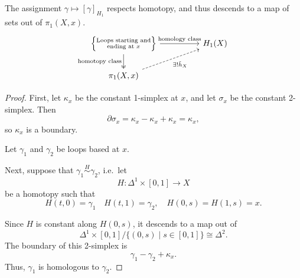 \documentclass[main.tex]{subfiles}
\begin{document}
\begin{lemma}
  \label{lemma:hurewicz_respects_homology_class}
  The assignment $\gamma \mapsto [\gamma]_{H_{1}}$ respects homotopy, and thus descends to a map of sets out of $\pi_{1}(X, x)$.
  \begin{equation*}
    \begin{tikzcd}[column sep=huge]
      \left\{\substack{\text{Loops starting and}\\\text{ending at }x}\right\}
      \arrow[r, "\text{homology class}"]
      \arrow[d, two heads, swap, "\text{homotopy class}"]
      & H_{1}(X)
      \\
      \pi_{1}(X, x)
      \arrow[ur, dashed, swap, "\exists!\tilde{h}_{X}"]
    \end{tikzcd}
  \end{equation*}
\end{lemma}
\begin{proof}
  First, let \(\kappa_{x}\) be the constant 1-simplex at \(x\), and let \(\sigma_{x}\) be the constant 2-simplex. Then
  \begin{equation*}
    \partial \sigma_{x} = \kappa_{x} - \kappa_{x} + \kappa_{x} = \kappa_{x},
  \end{equation*}
  so \(\kappa_{x}\) is a boundary.

  Let $\gamma_{1}$ and $\gamma_{2}$ be loops based at $x$.

  Next, suppose that $\gamma_{1} \overset{H}{\sim} \gamma_{2}$, i.e.\ let
  \begin{equation*}
    H\colon \Delta^{1} \times [0, 1] \to X
  \end{equation*}
  be a homotopy such that
  \begin{equation*}
    H(t, 0) = \gamma_{1}\quad H(t, 1) = \gamma_{2},\quad H(0, s) = H(1, s) = x.
  \end{equation*}

  Since \(H\) is constant along \(H(0, s)\), it descends to a map out of
  \begin{equation*}
    \Delta^{1} \times [0, 1] / \{ (0, s) \mid s \in [0, 1] \} \cong \Delta^{2}.
  \end{equation*}
  The boundary of this 2-simplex is
  \begin{equation*}
    \gamma_{1} - \gamma_{2} + \kappa_{x}.
  \end{equation*}
  Thus, \(\gamma_{1}\) is homologous to \(\gamma_{2}\).
\end{proof}
\end{document}
